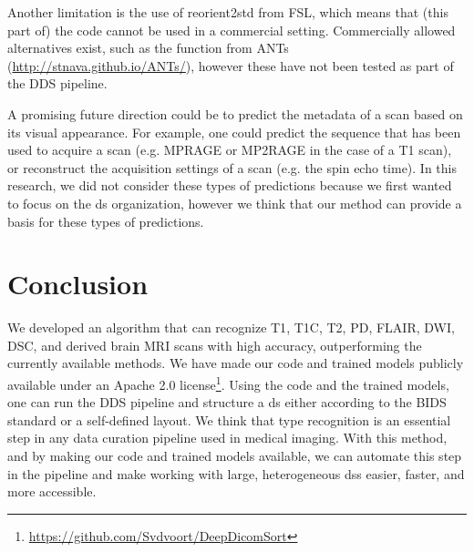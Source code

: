 Another limitation is the use of reorient2std from FSL, which means that (this part of) the code cannot be used in a commercial setting.
Commercially allowed alternatives exist, such as the  function from ANTs (\url{http://stnava.github.io/ANTs/}), however these have not been tested as part of the \gls{DDS} pipeline.

A promising future direction could be to predict the metadata of a \gls{scan} based on its visual appearance.
For example, one could predict the sequence that has been used to acquire a \gls{scan} (e.g. MPRAGE or MP2RAGE in the case of a \gls{T1} \gls{scan}), or reconstruct the acquisition settings of a \gls{scan} (e.g. the spin echo time).
In this research, we did not consider these types of predictions because we first wanted to focus on the \gls{ds} organization, however we think that our method can provide a basis for these types of predictions.

\section{Conclusion}

We developed an algorithm that can recognize \gls{T1}, \gls{T1C}, \gls{T2}, \gls{PD}, \gls{FLAIR}, \gls{DWI}, \gls{DSC}, and derived brain \gls{MRI} \glspl{scan} with high accuracy, outperforming the currently available methods.
We have made our code and trained models publicly available under an Apache 2.0 license\footnote{\url{https://github.com/Svdvoort/DeepDicomSort}}.
Using the code and the trained models, one can run the \gls{DDS} pipeline and structure a \gls{ds} either according to the \gls{BIDS} standard or a self-defined layout.
We think that \gls{type} recognition is an essential step in any data curation pipeline used in medical imaging.
With this method, and by making our code and trained models available, we can automate this step in the pipeline and make working with large, heterogeneous \glspl{ds} easier, faster, and more accessible.

